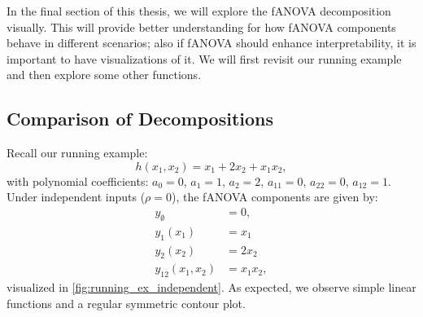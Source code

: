 In the final section of this thesis, we will explore the fANOVA decomposition visually. This will provide better understanding for how fANOVA components behave in different scenarios; also if fANOVA should enhance interpretability, it is important to have visualizations of it. We will first revisit our running example and then explore some other functions.
\subsection{Comparison of Decompositions}
Recall our running example:
$$h(x_1, x_2) = x_1 + 2 x_2 + x_1 x_2,$$
with polynomial coefficients: $a_0 = 0$, $a_1 = 1$, $a_2 = 2$, $a_{11} = 0$, $a_{22} = 0$, $a_{12} = 1$.
Under independent inputs ($\rho = 0$), the fANOVA components are given by:
\begin{align*}
y_{\emptyset} &= 0, \\
y_1(x_1) &= x_1\\
y_2(x_2) &= 2x_2\\
y_{12}(x_1, x_2) &= x_1x_2,
\end{align*}
visualized in \autoref{fig:running_ex_independent}. As expected, we observe simple linear functions and a regular symmetric contour plot.
